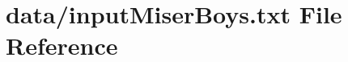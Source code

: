 \hypertarget{inputMiserBoys_8txt}{}\section{data/input\+Miser\+Boys.txt File Reference}
\label{inputMiserBoys_8txt}
